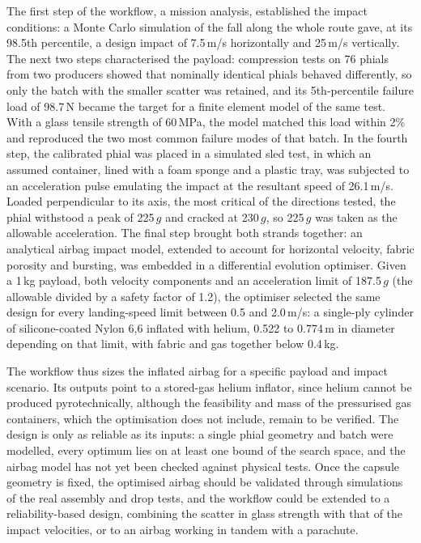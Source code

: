 The first step of the workflow, a mission analysis, established the impact conditions: a Monte Carlo simulation of the fall along the whole route gave, at its 98.5th percentile, a design impact of 7.5\,m/s horizontally and 25\,m/s vertically. The next two steps characterised the payload: compression tests on 76 phials from two producers showed that nominally identical phials behaved differently, so only the batch with the smaller scatter was retained, and its 5th-percentile failure load of 98.7\,N became the target for a finite element model of the same test. With a glass tensile strength of 60\,MPa, the model matched this load within 2\% and reproduced the two most common failure modes of that batch. In the fourth step, the calibrated phial was placed in a simulated sled test, in which an assumed container, lined with a foam sponge and a plastic tray, was subjected to an acceleration pulse emulating the impact at the resultant speed of 26.1\,m/s. Loaded perpendicular to its axis, the most critical of the directions tested, the phial withstood a peak of 225\,$g$ and cracked at 230\,$g$, so 225\,$g$ was taken as the allowable acceleration. The final step brought both strands together: an analytical airbag impact model, extended to account for horizontal velocity, fabric porosity and bursting, was embedded in a differential evolution optimiser. Given a 1\,kg payload, both velocity components and an acceleration limit of 187.5\,$g$ (the allowable divided by a safety factor of 1.2), the optimiser selected the same design for every landing-speed limit between 0.5 and 2.0\,m/s: a single-ply cylinder of silicone-coated Nylon 6,6 inflated with helium, 0.522 to 0.774\,m in diameter depending on that limit, with fabric and gas together below 0.4\,kg.

The workflow thus sizes the inflated airbag for a specific payload and impact scenario. Its outputs point to a stored-gas helium inflator, since helium cannot be produced pyrotechnically, although the feasibility and mass of the pressurised gas containers, which the optimisation does not include, remain to be verified. The design is only as reliable as its inputs: a single phial geometry and batch were modelled, every optimum lies on at least one bound of the search space, and the airbag model has not yet been checked against physical tests. Once the capsule geometry is fixed, the optimised airbag should be validated through simulations of the real assembly and drop tests, and the workflow could be extended to a reliability-based design, combining the scatter in glass strength with that of the impact velocities, or to an airbag working in tandem with a parachute.